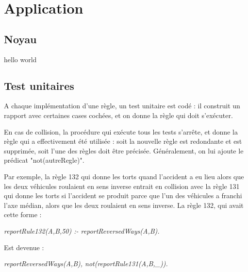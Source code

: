 \chapter{Application}

\section{Noyau}
hello world

\section{Test unitaires}

A chaque implémentation d'une règle, un test unitaire est codé : il construit un rapport avec certaines cases cochées, et on donne la règle qui doit s'exécuter.

En cas de collision, la procédure qui exécute tous les tests s'arrête, et donne la règle qui a effectivement été utilisée : soit la nouvelle règle est redondante et est supprimée, soit l'une des règles doit être précisée. Généralement, on lui ajoute le prédicat "not(autreRegle)". 

Par exemple, la règle 132 qui donne les torts quand l'accident a eu lieu alors que les deux véhicules roulaient en sens inverse entrait en collision avec la règle 131 qui donne les torts si l'accident se produit parce que l'un des véhicules a franchi l'axe médian, alors que les deux roulaient en sens inverse.
La règle 132, qui avait cette forme :

\begin{center}\textit{reportRule132(A,B,50) :-
    reportReversedWays(A,B).}\end{center} 

Est devenue :

\begin{center}\textit{reportReversedWays(A,B),
    not(reportRule131(A,B,_)).}\end{center} 